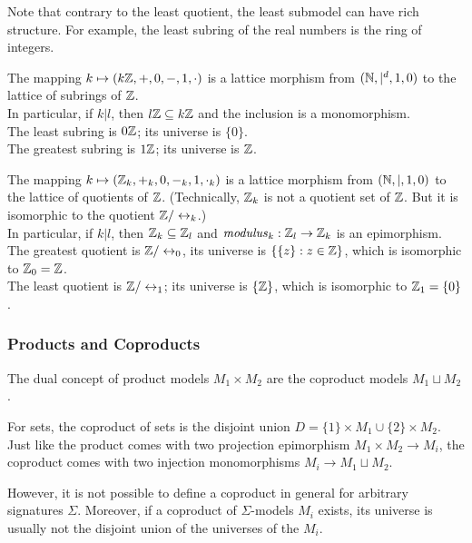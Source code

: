 Note that contrary to the least quotient, the least submodel can have rich structure.
For example, the least subring of the real numbers is the ring of integers.

\begin{example}\quad
\begin{compactitem}
\item The mapping $k\mapsto (k\mathbb{Z},+,0,-,1,\cdot)$ is a lattice morphism from $(\mathbb{N},|^d,1,0)$ to the lattice of subrings of $\mathbb{Z}$.\\
In particular, if $k|l$, then $l\mathbb{Z}\subseteq k\mathbb{Z}$ and the inclusion is a monomorphism.\\
The least subring is $0\mathbb{Z}$; its universe is $\{0\}$.\\
The greatest subring is $1\mathbb{Z}$; its universe is $\mathbb{Z}$.
\item The mapping $k\mapsto (\mathbb{Z}_k,+_k,0,-_k,1,\cdot_k)$ is a lattice morphism from $(\mathbb{N},|,1,0)$ to the lattice of quotients of $\mathbb{Z}$.
(Technically, $\mathbb{Z}_k$ is not a quotient set of $\mathbb{Z}$. But it is isomorphic to the quotient $\Z/\Equiv_k$.)\\
In particular, if $k|l$, then $\mathbb{Z}_k\subseteq \mathbb{Z}_l$ and $\mathit{modulus}_k:\mathbb{Z}_l\to\mathbb{Z}_k$ is an epimorphism.\\
The greatest quotient is $\Z/\Equiv_0$, its universe is $\{\{z\}:z\in \mathbb{Z}\}$, which is isomorphic to $\mathbb{Z}_0=\mathbb{Z}$.\\
The least quotient is $\Z/\Equiv_1$; its universe is $\{\mathbb{Z}\}$, which is isomorphic to $\mathbb{Z}_1=\{0\}$.
\end{compactitem}
\end{example}

\subsubsection{Products and Coproducts}\label{sec:univ:meta:prodcoprod}

The dual concept of product models $M_1\times M_2$ are the coproduct models $M_1\sqcup M_2$.

For sets, the coproduct of sets is the disjoint union $D=\{1\}\times M_1\cup \{2\}\times M_2$.
Just like the product comes with two projection epimorphism $M_1\times M_2\to M_i$, the coproduct comes with two injection monomorphisms $M_i\to M_1\sqcup M_2$.

However, it is not possible to define a coproduct in general for arbitrary signatures $\Sigma$.
Moreover, if a coproduct of $\Sigma$-models $M_i$ exists, its universe is usually not the disjoint union of the universes of the $M_i$.

